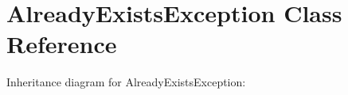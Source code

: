 \hypertarget{classAlreadyExistsException}{}\section{Already\+Exists\+Exception Class Reference}
\label{classAlreadyExistsException}


Inheritance diagram for Already\+Exists\+Exception\+:
